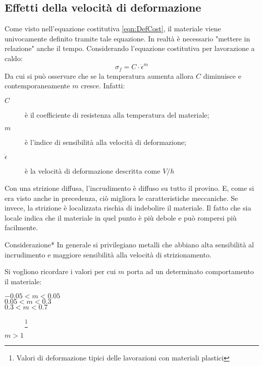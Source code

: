 \subsection{Effetti della velocità di deformazione}
Come visto nell'equazione costitutiva \ref{eqn:DefCost}, il materiale viene univocamente definito tramite tale equazione. In realtà è necessario "mettere in relazione" anche il tempo. Considerando l'equazione costitutiva per lavorazione a caldo:
\begin{equation}
\sigma_f = C \cdot \dot{\epsilon}^m
\label{eqn:CostCaldo}
\end{equation}
Da cui si può osservare che se la temperatura aumenta allora $C$ diminuisce e contemporaneamente $m$ cresce. Infatti:
\begin{description}
\item[$C$] è il coefficiente di resistenza alla temperatura del materiale;
\item[$m$] è l'indice di sensibilità alla velocità di deformazione;
\item[$\dot{\epsilon}$] è la velocità di deformazione descritta come $V/h$
\end{description}
Con una strizione diffusa, l'incrudimento è diffuso su tutto il provino. E, come si era visto anche in precedenza, ciò migliora le caratteristiche meccaniche. Se invece, la strizione è localizzata rischia di indebolire il materiale.
Il fatto che sia locale indica che il materiale in quel punto è più debole e può rompersi più facilmente.

\begin{definition}{Considerazione}{*}
In generale si privilegiano metalli che abbiano alta sensibilità al incrudimento e maggiore sensibilità alla velocità di strizionamento.
\end{definition}


Si vogliono ricordare i valori per cui $m$ porta ad un determinato comportamento il materiale:
\begin{description}
\item[$-0.05 < m < 0.05$] 
\item[$0.05 < m < 0.3$] 
\item[$0.3 < m < 0.7$] %
\footnote{Valori di deformazione tipici delle lavorazioni con materiali plastici}
\item[$m > 1$] 
\end{description}

